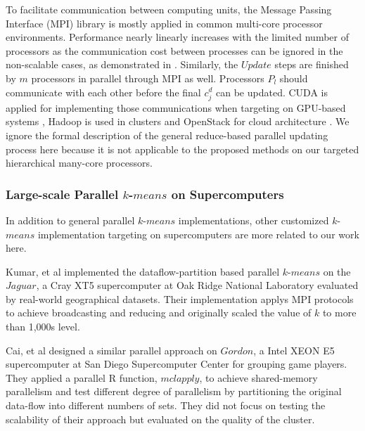 \documentclass[10pt,journal,compsoc]{IEEEtran}
\begin{document}
To facilitate communication between computing units, the Message Passing Interface (MPI) library is mostly applied in common multi-core processor environments. Performance nearly linearly increases with the limited number of processors as the communication cost between processes can be ignored in the non-scalable cases, as demonstrated in \cite{dhillon2002data}. Similarly, the $Update$ steps are finished by $m$ processors in parallel through MPI as well. Processors $P_l$ should communicate with each other before the final $c^d_j$ can be updated. CUDA is applied for implementing those communications when targeting on GPU-based systems \cite{zechner2009accelerating}, Hadoop is used in clusters \cite{cui2014optimized} and OpenStack for cloud architecture \cite{haut2017cloud}. We ignore the formal description of the general reduce-based parallel updating process here because it is not applicable to the proposed methods on our targeted hierarchical many-core processors. 

\subsubsection{Large-scale Parallel $k$-$means$ on Supercomputers}
In addition to general parallel $k$-$means$ implementations, other customized $k$-$means$ implementation targeting on supercomputers are more related to our work here. 

Kumar, et al \cite{kumar2011parallel} implemented the dataflow-partition based parallel $k$-$means$ on the $Jaguar$, a Cray XT5 supercomputer
at Oak Ridge National Laboratory evaluated by real-world geographical datasets. Their implementation applys MPI protocols to achieve broadcasting and reducing and originally scaled the value of $k$ to more than 1,000s level.  

Cai, et al \cite{cai2015grouping} designed a similar parallel approach on $Gordon$, a Intel XEON E5 supercomputer at San Diego Supercomputer Center for grouping game players. They applied a parallel R function, $mclapply$, to achieve shared-memory parallelism and test different degree of parallelism by partitioning the original data-flow into different numbers of sets. They did not focus on testing the scalability of their approach but evaluated on the quality of the cluster. 
\end{document}

